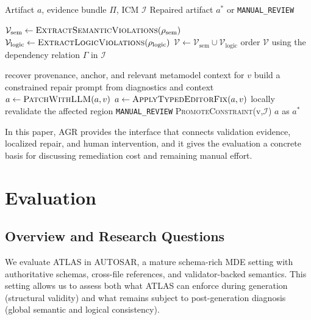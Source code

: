 \documentclass[acmlarge,nonacm]{acmart}
\theoremstyle{acmplain}
\theoremstyle{acmdefinition}
\begin{document}
\begin{algorithm}[t]
\caption{Layer-2-Guided Repair with Human/LLM Routes and Constraint Promotion}
\label{alg:repair}
\begin{algorithmic}[1]
\small
\Require Artifact $a$, evidence bundle $\Pi$, ICM $\mathcal{I}$
\Ensure Repaired artifact $a^*$ or \texttt{MANUAL\_REVIEW}

\State $\mathcal{V}_{\text{sem}} \gets \textsc{ExtractSemanticViolations}(\rho_{\text{sem}})$
\State $\mathcal{V}_{\text{logic}} \gets \textsc{ExtractLogicViolations}(\rho_{\text{logic}})$
\State $\mathcal{V} \gets \mathcal{V}_{\text{sem}} \cup \mathcal{V}_{\text{logic}}$
\State order $\mathcal{V}$ using the dependency relation $\Gamma$ in $\mathcal{I}$

    \State recover provenance, anchor, and relevant metamodel context for $v$
        \State build a constrained repair prompt from diagnostics and context
        \State $a \gets \textsc{PatchWithLLM}(a,v)$
    \Else
        \State $a \gets \textsc{ApplyTypedEditorFix}(a,v)$
    \EndIf
    \State locally revalidate the affected region
        \State \Return \texttt{MANUAL\_REVIEW}
    \EndIf
        \State \textsc{PromoteConstraint}(v,$\mathcal{I}$)
    \EndIf
\EndFor
\State \Return $a$ as $a^*$
\end{algorithmic}
\end{algorithm}

In this paper, AGR provides the interface that connects validation evidence, localized repair, and human intervention, and it gives the evaluation a concrete basis for discussing remediation cost and remaining manual effort.


\section{Evaluation}
\label{sec:evaluation}
\subsection{Overview and Research Questions}
\label{sec:evaluation-overview}

We evaluate ATLAS in AUTOSAR, a mature schema-rich MDE setting with authoritative schemas, cross-file references, and validator-backed semantics. This setting allows us to assess both what ATLAS can enforce during generation (structural validity) and what remains subject to post-generation diagnosis (global semantic and logical consistency).
\end{document}
